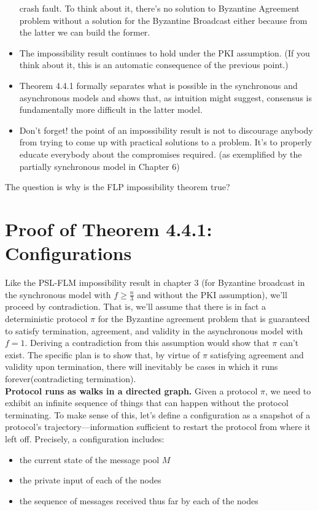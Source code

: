 \begin{itemize}
    crash fault. To think about it, there's no solution to Byzantine Agreement problem without a solution for the Byzantine Broadcast either because from the latter we can build the former.
    \item The impossibility result continues to hold under the PKI assumption. (If you think about it, this is an automatic consequence of the previous point.)
    \item Theorem 4.4.1 formally separates what is possible in the synchronous and asynchronous
    models and shows that, as intuition might suggest, consensus is fundamentally more
    difficult in the latter model.
    \item Don’t forget! the point of an impossibility result is not to discourage anybody from
    trying to come up with practical solutions to a problem. It’s to properly educate
    everybody about the compromises required. (as exemplified by the partially synchronous
    model in Chapter 6)
\end{itemize}

The question is why is the FLP impossibility theorem true?

\section{Proof of Theorem 4.4.1: Configurations}
Like the PSL-FLM impossibility result in chapter 3 (for Byzantine broadcast in the synchronous model with $f \geq \frac{n}{3}$ and without the PKI assumption), we’ll proceed by contradiction. That is, we’ll assume that there is in fact a deterministic protocol $\pi$ for the Byzantine
agreement problem that is guaranteed to satisfy termination, agreement, and validity in
the asynchronous model with $f = 1$. Deriving a contradiction from this assumption would
show that $\pi$ can’t exist. The specific plan is to show that, by virtue of $\pi$ satisfying agreement and validity upon termination, there will inevitably be cases in which it runs forever(contradicting termination).\\

\noindent
\textbf{Protocol runs as walks in a directed graph.} Given a protocol $\pi$, we need to exhibit
an infinite sequence of things that can happen without the protocol terminating. To make
sense of this, let’s define a configuration as a snapshot of a protocol’s trajectory—information
sufficient to restart the protocol from where it left off. Precisely, a configuration includes:
\begin{itemize}
    \item the current state of the message pool $M$
    \item the private input of each of the nodes
    \item the sequence of messages received thus far by each of the nodes
\end{itemize}

